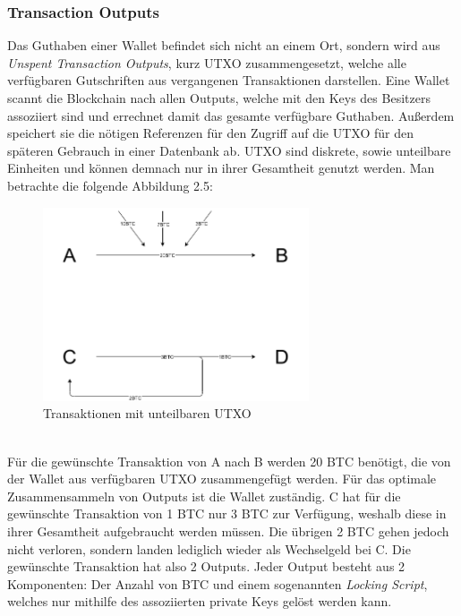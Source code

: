 \subsubsection{Transaction Outputs}
Das Guthaben einer Wallet befindet sich nicht an einem Ort, sondern wird aus \emph{Unspent Transaction Outputs}, kurz UTXO zusammengesetzt, welche alle verfügbaren Gutschriften aus vergangenen Transaktionen darstellen.
Eine Wallet scannt die Blockchain nach allen Outputs, welche mit den Keys des Besitzers assoziiert sind und errechnet damit das gesamte verfügbare Guthaben. Außerdem speichert sie die nötigen Referenzen für den Zugriff auf die UTXO für den späteren Gebrauch in einer Datenbank ab. UTXO sind diskrete, sowie unteilbare Einheiten und können demnach nur in ihrer Gesamtheit genutzt werden. Man betrachte die folgende Abbildung 2.5:
\begin{figure}[htpb]
	\centering
	\includegraphics[width=0.7\textwidth]{images/UTXO.png}
	\caption{Transaktionen mit unteilbaren UTXO}
	\label{6braun:fig:Transaktionen}
\end{figure}\\
Für die gewünschte Transaktion von A nach B werden 20 BTC benötigt, die von der Wallet aus verfügbaren UTXO zusammengefügt werden. 
Für das optimale Zusammensammeln von Outputs ist die Wallet zuständig.
C hat für die gewünschte Transaktion von 1 BTC nur 3 BTC zur Verfügung, weshalb diese in ihrer Gesamtheit aufgebraucht werden müssen.
Die übrigen 2 BTC gehen jedoch nicht verloren, sondern landen lediglich wieder als Wechselgeld bei C. 
Die gewünschte Transaktion hat also 2 Outputs.
Jeder Output besteht aus 2 Komponenten: Der Anzahl von BTC und einem sogenannten \emph{Locking Script}, welches nur mithilfe des assoziierten private Keys gelöst werden kann.

